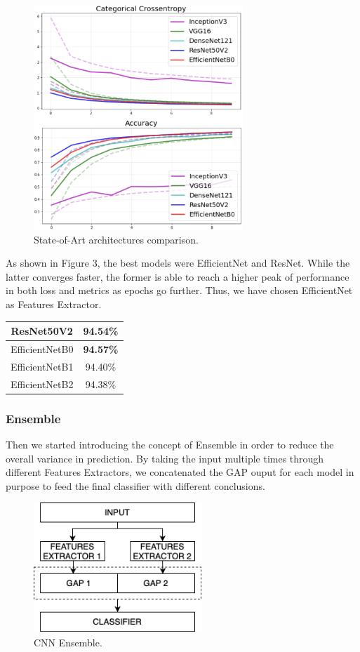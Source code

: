\documentclass[conference,compsoc]{IEEEtran}
\begin{document}
\begin{figure}[h!]
\centering
\includegraphics[width=3.1in]{img/comparison.jpg}
\caption{State-of-Art architectures comparison.}
\label{fig_sim}
\end{figure}

As shown in Figure 3, the best models were EfficientNet and ResNet. While the latter converges faster, the former is able to reach a higher peak of performance in both loss and metrics as epochs go further. Thus, we have chosen EfficientNet as Features Extractor.

\begin{center}
\begin{tabular}{ c c }
\hline\hline
 ResNet50V2 & 94.54\% \\ 
\hline
 EfficientNetB0 & \textbf{94.57\%}  \\  
 EfficientNetB1 & 94.40\%  \\
 EfficientNetB2 & 94.38\% \\
\hline\hline
\end{tabular}
\end{center}

\subsubsection{Ensemble}
Then we started introducing the concept of Ensemble in order to reduce the overall variance in prediction. By taking the input multiple times through different Features Extractors, we concatenated the GAP ouput for each model in purpose to feed the final classifier with different conclusions.

\begin{figure}[h!]
\centering
\includegraphics[width=2.5in]{img/ensemble.png}
\caption{CNN Ensemble.}
\label{fig_sim}
\end{figure}
\end{document}
